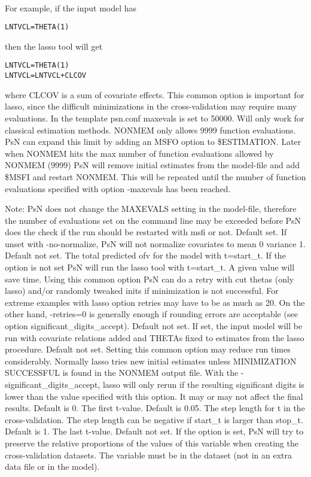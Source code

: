 \begin{optionlist}
\\For example, if the input model has
\begin{verbatim}
LNTVCL=THETA(1)
\end{verbatim}
then the lasso tool will get
\begin{verbatim}
LNTVCL=THETA(1)
LNTVCL=LNTVCL+CLCOV
\end{verbatim}
where CLCOV is a sum of covariate effects.
\nextopt
{}
This common option is important for lasso, since the difficult minimizations in the cross-validation may require many evaluations. In the template psn.conf maxevals is set to 50000. Will only work for classical estimation methods. NONMEM only allows 9999 function evaluations. PsN can expand this limit by adding an MSFO option to \$ESTIMATION. Later when NONMEM hits the max number of function evaluations allowed by NONMEM (9999) PsN will remove initial estimates from the model-file and add \$MSFI and restart NONMEM. This will be repeated until the number of function evaluations specified with option -maxevals has been reached. 

Note: PsN does not change the MAXEVALS setting in the model-file, therefore the number of evaluations set on the command line may be exceeded before PsN does the check if the run should be restarted with msfi or not. 
\nextopt
{}
Default set. If unset with -no-normalize, PsN will not normalize covariates to mean 0 variance 1.
\nextopt
{}
Default not set. The total predicted ofv for the model with t=start\_t.  If the option is not set PsN will run the lasso tool with t=start\_t. A given value will save time. 
\nextopt
{}
Using this common option PsN can do a retry with cut thetas (only lasso) and/or randomly tweaked inits if minimization is not successful. For extreme examples with lasso option retries may have to be as much as 20. On the other hand, -retries=0 is generally enough if rounding errors are acceptable (see option significant\_digits\_accept).
\nextopt
{}
Default not set. If set, the input model will be run with covariate relations added and THETAs fixed to estimates from the lasso procedure. 
\nextopt
{}
Default not set. Setting this common option may reduce run times considerably. Normally lasso tries new initial estimates unless MINIMIZATION SUCCESSFUL is found in the NONMEM output file. With the -significant\_digits\_accept, lasso will only rerun if the resulting significant digits is lower than the value specified with this option. It may or may not affect the final results. 
\nextopt
{}
Default is 0. The first t-value. 
\nextopt
{}
Default is 0.05. The step length for t in the cross-validation. The step length can be negative if start\_t is larger than stop\_t. 
\nextopt
{}
Default is 1. The last t-value. 
\nextopt
{}
Default not set. If the option is set, PsN will try to preserve the relative proportions of the values of this variable when creating the cross-validation datasets. The variable must be in the dataset (not in an extra data file or in the model). 
\nextopt
\end{optionlist}
